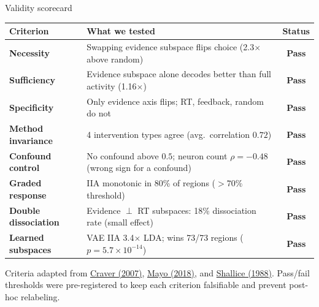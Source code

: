 \documentclass[aspectratio=169,11pt]{beamer}
\begin{document}
\begin{frame}{Validity scorecard}
\vspace{0.5em}
\begin{center}
{\scriptsize
\begin{tabular}{lp{7cm}c}
\toprule
\textbf{Criterion} & \textbf{What we tested} & \textbf{Status} \\
\midrule
\textbf{Necessity} & Swapping evidence subspace flips choice (2.3$\times$ above random) & \textcolor{pass}{\textbf{Pass}} \\
\textbf{Sufficiency} & Evidence subspace alone decodes better than full activity (1.16$\times$) & \textcolor{pass}{\textbf{Pass}} \\
\textbf{Specificity} & Only evidence axis flips; RT, feedback, random do not & \textcolor{pass}{\textbf{Pass}} \\
\textbf{Method invariance} & 4 intervention types agree (avg.\ correlation $0.72$) & \textcolor{pass}{\textbf{Pass}} \\
\textbf{Confound control} & No confound above $0.5$; neuron count $\rho = -0.48$ (wrong sign for a confound) & \textcolor{pass}{\textbf{Pass}} \\
\textbf{Graded response} & IIA monotonic in 80\% of regions ($> 70\%$ threshold) & \textcolor{pass}{\textbf{Pass}} \\
\textbf{Double dissociation} & Evidence $\perp$ RT subspaces: 18\% dissociation rate (small effect) & \textcolor{pass}{\textbf{Pass}} \\
\textbf{Learned subspaces} & VAE IIA 3.4$\times$ LDA; wins 73/73 regions ($p = 5.7 \times 10^{-14}$) & \textcolor{pass}{\textbf{Pass}} \\
\bottomrule
\end{tabular}
}
\end{center}

\vspace{0.6em}
{\small Criteria adapted from \href{https://doi.org/10.1093/acprof:oso/9780199299317.001.0001}{Craver (2007)}, \href{https://doi.org/10.1017/9781107286184}{Mayo (2018)}, and \href{https://doi.org/10.1017/CBO9780511526817}{Shallice (1988)}. Pass/fail thresholds were pre-registered to keep each criterion falsifiable and prevent post-hoc relabeling.}
\end{frame}

\end{document}
